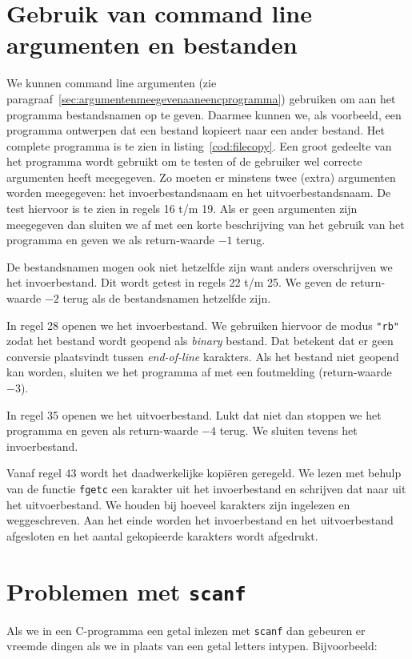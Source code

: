 \section{Gebruik van command line argumenten en bestanden}
We kunnen command line argumenten (zie paragraaf~\ref{sec:argumentenmeegevenaaneencprogramma}) gebruiken om aan het programma bestandsnamen op te geven. Daarmee kunnen we, als voorbeeld, een programma ontwerpen dat een bestand kopieert naar een ander bestand. Het complete programma is te zien in listing~\ref{cod:filecopy}.
%
%
Een groot gedeelte van het programma wordt gebruikt om te testen of de gebruiker wel correcte argumenten heeft meegegeven. Zo moeten er minstens twee (extra) argumenten worden meegegeven: het invoerbestandsnaam en het uitvoerbestandsnaam. De test hiervoor is te zien in regels 16 t/m 19. Als er geen argumenten zijn meegegeven dan sluiten we af met een korte beschrijving van het gebruik van het programma en geven we als return-waarde $-1$ terug.

De bestandsnamen mogen ook niet hetzelfde zijn want anders overschrijven we het invoerbestand. Dit wordt getest in regels 22 t/m 25. We geven de return-waarde $-2$ terug als de bestandsnamen hetzelfde zijn.

In regel 28 openen we het invoerbestand. We gebruiken hiervoor de modus \texttt{"{}rb"} zodat het bestand wordt geopend als \textsl{binary} bestand. Dat betekent dat er geen conversie plaatsvindt tussen \textsl{end-of-line} karakters. Als het bestand niet geopend kan worden, sluiten we het programma af met een foutmelding (return-waarde $-3$).

In regel 35 openen we het uitvoerbestand. Lukt dat niet dan stoppen we het programma en geven als return-waarde $-4$ terug. We sluiten tevens het invoerbestand.

Vanaf regel 43 wordt het daadwerkelijke kopiëren geregeld. We lezen met behulp van de functie \texttt{fgetc} een karakter uit het invoerbestand en schrijven dat naar uit het uitvoerbestand. We houden bij hoeveel karakters zijn ingelezen en weggeschreven. Aan het einde worden het invoerbestand en het uitvoerbestand afgesloten en het aantal gekopieerde karakters wordt afgedrukt.


\section{Problemen met \texttt{scanf}}
\label{sec:problemenmetscanf}
Als we in een C-programma een getal inlezen met \lstinline|scanf| dan gebeuren er vreemde dingen als we in plaats van een getal letters intypen. Bijvoorbeeld:

